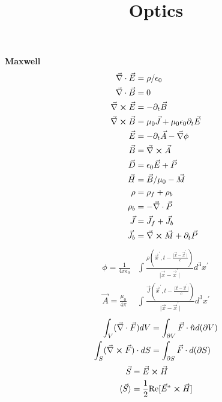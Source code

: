 \documentclass[12pt]{article}
\title{\vspace{-2em}Optics}
\date{}
\begin{document}
\maketitle

\vspace{-4em}
\begin{multicols}{3}
\textbf{Maxwell}
\begin{align}
  \vec{\nabla} \cdot \vec{E} &= \rho / \epsilon_0\\
  \vec{\nabla} \cdot \vec{B} &= 0\\
  \vec{\nabla} \cross \vec{E} &= - \partial_t \vec{B}\\
  \vec{\nabla} \cross \vec{B} &= \mu_0 \vec{J} +
  \mu_0 \epsilon_0 \partial_t \vec{E}\\
  \vec{E} &= -\partial_t \vec{A} - \vec{\nabla} \phi\\
  \vec{B} &= \vec{\nabla} \cross \vec{A}\\
  \vec{D} &= \epsilon_0 \vec{E} + \vec{P}\\
  \vec{H} &= \vec{B}/\mu_0 - \vec{M}\\
  \rho &= \rho_f + \rho_b\\
  \rho_b &= -\vec{\nabla} \cdot \vec{P}\\
  \vec{J} &= \vec{J}_{f} + \vec{J}_{b}\\
  \vec{J}_b &= \vec{\nabla} \cross \vec{M} + \partial_t \vec{P}
\end{align}
\begin{align}
  \phi = \frac{1}{4\pi\epsilon_0} &\int \frac{
    \rho(\vec{x}^{\prime}, t - \frac{\lvert\vec{x} - \vec{x}^{\prime}\rvert}{c})}{
    \lvert \vec{x} - \vec{x}^{\prime} \rvert} d^3 x^{\prime}\\
  \vec{A} = \frac{\mu_0}{4\pi} &\int \frac{\vec{J}(\vec{x}^{\prime},
    t - \frac{\lvert \vec{x} - \vec{x}^{\prime} \rvert}{c})}
      {\lvert \vec{x} - \vec{x}^{\prime} \rvert} d^3 x^{\prime}
\end{align}
\begin{align}
  \int_V (\vec{\nabla} \cdot \vec{F}) dV &= \int_{\partial V} \vec{F} \cdot \hat{n} d(\partial V)\\
  \int_{S} (\vec{\nabla} \cross \vec{F}) \cdot dS &= \int_{\partial S} \vec{F} \cdot d(\partial S)
\end{align}
\begin{align}
  \vec{S} &= \vec{E} \cross \vec{H}\\
  \langle \vec{S} \rangle &= \frac{1}{2}
  \textrm{Re}[\vec{E}^{*} \cross \vec{H}]\\

\end{align}
\end{multicols}
\end{document}
